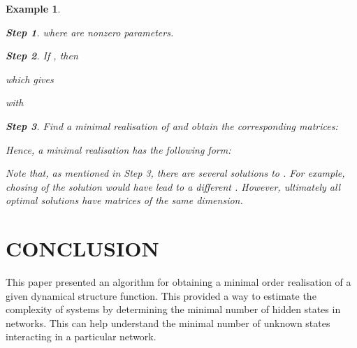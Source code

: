 \documentclass[twocolumn,12pt]{autart}
\theoremstyle{plain}
\newtheorem{example}{Example}
\newtheorem{Steps}{Step}
\begin{document}
\begin{example}
\begin{Steps}
where  are nonzero parameters.
\end{Steps}
\begin{Steps}
If , then 

which gives
 
with

\end{Steps}

\begin{Steps}
Find a minimal realisation of  and obtain the corresponding  matrices:

Hence, a minimal realisation has the following form:

\end{Steps}


Note that, as mentioned in Step 3, there are several solutions to . For example, chosing of the solution  would have lead to a different .
However, ultimately all optimal solutions have  matrices of the same dimension.

\end{example}
\section{CONCLUSION}
This paper presented an algorithm for obtaining a minimal order realisation of a given dynamical structure function. This provided a way to estimate the complexity of systems by determining the minimal number of hidden states in networks. This can help understand the minimal number of unknown states interacting in a particular network.
 
\end{document}
